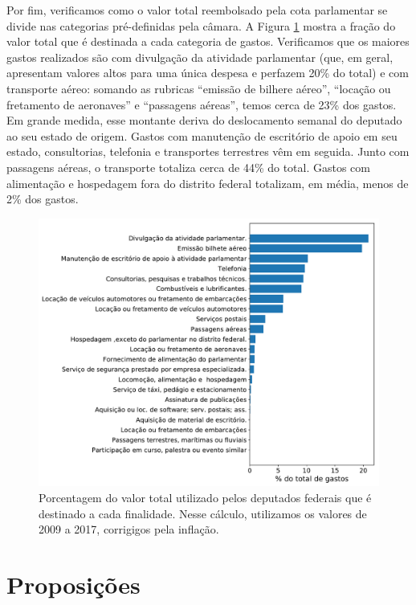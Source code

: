 \documentclass[12pt,a4paper]{article}
\begin{document}
Por fim, verificamos como o valor total reembolsado pela cota parlamentar se divide nas categorias pré-definidas
pela câmara. A Figura \ref{fig:despesas-por-tipo} mostra a fração do valor total que é destinada a cada categoria
de gastos. Verificamos que os maiores gastos realizados são com divulgação da atividade parlamentar (que, em geral,
apresentam valores altos para uma única despesa e perfazem 20\% do total) e com transporte aéreo: somando as rubricas
``emissão de bilhere aéreo'', ``locação ou fretamento de aeronaves'' e ``passagens aéreas'', temos cerca de
23\% dos gastos. Em grande medida, esse montante deriva do deslocamento semanal do deputado ao seu estado de origem.
Gastos com manutenção de escritório de apoio em seu estado, consultorias, telefonia e transportes terrestres vêm
em seguida. Junto com passagens aéreas, o transporte totaliza cerca de 44\% do total. Gastos com alimentação e
hospedagem fora do distrito federal totalizam, em média, menos de 2\% dos gastos.

\begin{figure}[H]
\centering
\includegraphics[width=1.0\textwidth]{graficos/total-despesas-por-tipo_2019-04-29.pdf}
\caption{Porcentagem do valor total utilizado pelos deputados federais que é destinado a cada finalidade. Nesse
cálculo, utilizamos os valores de 2009 a 2017, corrigigos pela inflação.}
\label{fig:despesas-por-tipo}
\end{figure} 



\section{Proposições}
\end{document}
